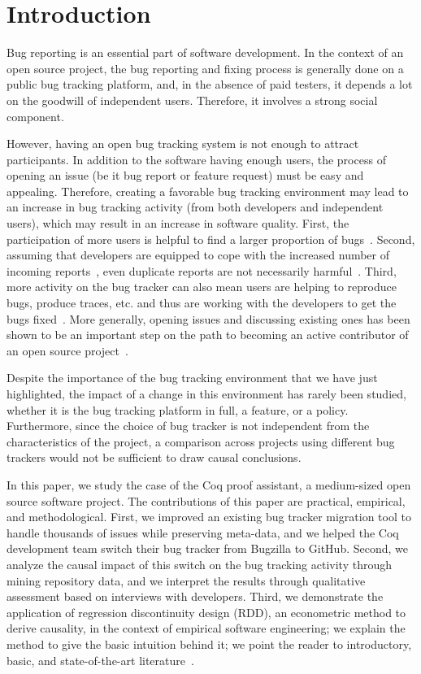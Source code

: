 \documentclass[conference]{IEEEtran}
\begin{document}
\section{Introduction}

Bug reporting is an essential part of software development.
In the context of an open source project, the bug reporting and fixing process is generally done on a public bug tracking platform, and, in the absence of paid testers, it depends a lot on the goodwill of independent users. Therefore, it involves a strong social component.

However, having an open bug tracking system is not enough to attract participants. In addition to the software having enough users, the process of opening an issue (be it bug report or feature request) must be easy and appealing. Therefore, creating a favorable bug tracking environment may lead to an increase in bug tracking activity (from both developers and independent users), which may result in an increase in software quality. First, the participation of more users is helpful to find a larger proportion of bugs~\cite{raymond1999cathedral,van2009shallow}. Second, assuming that developers are equipped to cope with the increased number of incoming reports~\cite{anvik2005coping, davidson2011coping}, even duplicate reports are not necessarily harmful~\cite{Bettenburg2008}. Third, more activity on the bug tracker can also mean users are helping to reproduce bugs, produce traces, etc. and thus are working with the developers to get the bugs fixed~\cite{breu2010information}. More generally, opening issues and discussing existing ones has been shown to be an important step on the path to becoming an active contributor of an open source project~\cite{jensen2007role, nakakoji2002evolution, ye2003toward}.

Despite the importance of the bug tracking environment that we have just highlighted, the impact of a change in this environment has rarely been studied, whether it is the bug tracking platform in full, a feature, or a policy.
Furthermore, since the choice of bug tracker is not independent from the characteristics of the project, a comparison across projects using different bug trackers would not be sufficient to draw causal conclusions.

In this paper, we study the case of the Coq proof assistant, a medium-sized open source software project.
The contributions of this paper are practical, empirical, and methodological. First, we improved an existing bug tracker migration tool to handle thousands of issues while preserving meta-data, and we helped the Coq development team switch their bug tracker from Bugzilla to GitHub. Second, we analyze the causal impact of this switch on the bug tracking activity through mining repository data, and we interpret the results through qualitative assessment based on interviews with developers. Third, we demonstrate the application of regression discontinuity design (RDD), an econometric method to derive causality, in the context of empirical software engineering; we explain the method to give the basic intuition behind it; we point the reader to introductory, basic, and state-of-the-art literature~\cite{angrist2008mostly,angrist2014mastering,jacob2012practical,lee2010regression,hausman2018regression}.
\end{document}
